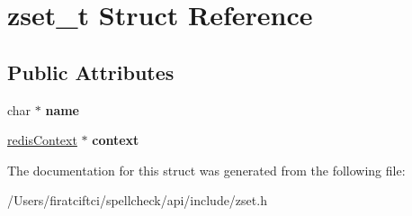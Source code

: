 \hypertarget{structzset__t}{}\section{zset\+\_\+t Struct Reference}
\label{structzset__t}
\subsection*{Public Attributes}
\begin{DoxyCompactItemize}
\item 
\mbox{\label{structzset__t_aac0cee826c38fc2cafc1b12767970fe1}} 
char $\ast$ {\bfseries name}
\item 
\mbox{\label{structzset__t_aa63f9f702c85919482a586095182e13f}} 
\mbox{\hyperlink{structredis_context}{redis\+Context}} $\ast$ {\bfseries context}
\end{DoxyCompactItemize}


The documentation for this struct was generated from the following file\+:\begin{DoxyCompactItemize}
\item 
/\+Users/firatciftci/spellcheck/api/include/zset.\+h\end{DoxyCompactItemize}
